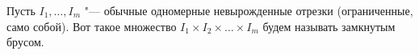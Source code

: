  Пусть $I_1,\ldots,I_m$ "--- обычные одномерные невырожденные отрезки (ограниченные, само собой).
	 Вот такое множество $I_1\times I_2\times\dots\times I_m$ будем называть замкнутым брусом.
	 